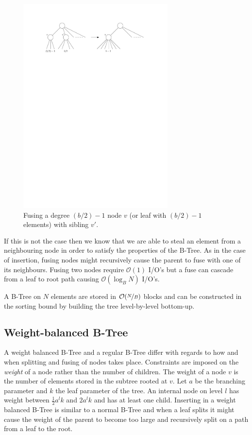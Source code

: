 \documentclass[twoside,11pt,openright]{report}
\begin{document}
\begin{figure}[H]
	\centering
	\includegraphics[width=0.7\textwidth]{../figures/b_tree_fuse}
	\caption{Fusing a degree $(b/2)-1$ node $v$ (or leaf with $(b/2)-1$ elements) with sibling $v'$.}
	\label{fig:b_tree_fuse}
\end{figure}

If this is not the case then we know that we are able to steal an element from a neighbouring node in order to satisfy the properties of the B-Tree. As in the case of insertion, fusing nodes might recursively cause the parent to fuse with one of its neighbours.
Fusing two nodes require $\mathcal{O}(1)$ I/O's but a fuse can cascade from a leaf to root path causing $\mathcal{O}(\log_B N)$ I/O's.

A B-Tree on $N$ elements are stored in $\mathcal{O}(\nicefrac{N}{B})$ blocks and can be constructed in the sorting bound by building the tree level-by-level bottom-up.

\subsection{Weight-balanced B-Tree}
A weight balanced B-Tree and a regular B-Tree differ with regards to how and when splitting and fusing of nodes takes place. Constraints are imposed on the \textit{weight} of a node rather than the number of children. The weight of a node $v$ is the number of elements stored in the subtree rooted at $v$. Let $a$ be the branching parameter and $k$ the leaf parameter of the tree. An internal node on level $l$ has weight between $\frac{1}{2}a^lk$ and $2a^lk$ and has at least one child. Inserting in a weight balanced B-Tree is similar to a normal B-Tree and when a leaf splits it might cause the weight of the parent to become too large and recursively split on a path from a leaf to the root.
\end{document}

